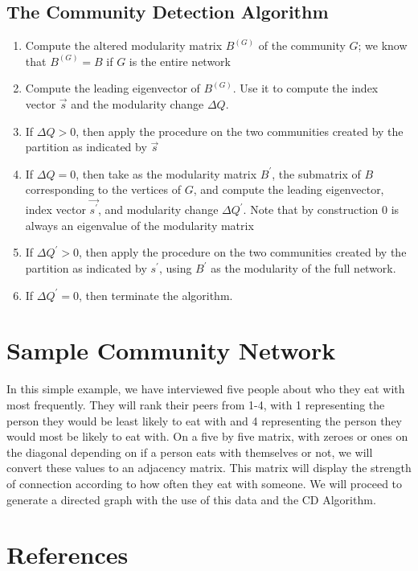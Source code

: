 \documentclass{article}
\begin{document}
\subsection*{The Community Detection Algorithm}

\begin{enumerate}
  \item Compute the altered modularity matrix $B^{(G)}$ of the community $G$; we know that $B^{(G)} = B$ if $G$ is the entire network
  \item Compute the leading eigenvector of $B^{(G)}$. Use it to compute the index vector $\vec{s}$ and the modularity change $\Delta Q$.
  \item If $\Delta Q > 0$, then apply the procedure on the two communities created by the partition as indicated by $\vec{s}$
  \item If $\Delta Q = 0$, then take as the modularity matrix $B^\prime$, the submatrix of $B$ corresponding to the vertices of $G$, and compute the leading
        eigenvector, index vector $\vec{s^\prime}$, and modularity change $\Delta Q^{\prime}$. Note that by construction 0 is always an eigenvalue of the modularity matrix  
  \item If $\Delta Q^{\prime} > 0$, then apply the procedure on the two communities created by the partition as indicated by $s^\prime$, using $B^\prime$ as the modularity of the full network.
  \item If $\Delta Q^{\prime} = 0$, then terminate the algorithm.
\end{enumerate}

\section*{Sample Community Network}
In this simple example, we have interviewed five people about who they eat with most frequently. 
They will rank their peers from 1-4, with 1 representing the person they would be least likely to eat with and 4 representing the person they would most be likely to eat with. 
On a five by five matrix, with zeroes or ones on the diagonal depending on if a person eats with themselves or not, we will convert these values to an adjacency matrix.
This matrix will display the strength of connection according to how often they eat with someone.
We will proceed to generate a directed graph with the use of this data and the CD Algorithm.

\pagebreak
\section*{References}
\end{document}
